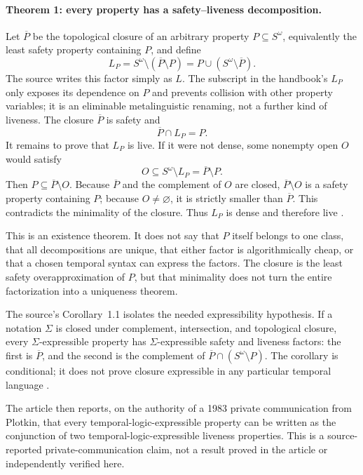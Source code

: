 \paragraph{Theorem 1: every property has a safety--liveness decomposition.}
Let \(\overline P\) be the topological closure of an arbitrary property
\(P\subseteq S^\omega\), equivalently the least safety property containing
\(P\), and define
\[
 L_P
 =S^\omega\setminus(\overline P\setminus P)
 =P\cup(S^\omega\setminus\overline P).
\]
The source writes this factor simply as \(L\).  The subscript in the
handbook's \(L_P\) only exposes its dependence on \(P\) and prevents collision
with other property variables; it is an eliminable metalinguistic renaming,
not a further kind of liveness.  The closure \(\overline P\) is
safety and
\[
 \overline P\cap L_P=P.
\]
It remains to prove that \(L_P\) is live.  If it were not dense, some nonempty
open \(O\) would satisfy
\[
 O\subseteq S^\omega\setminus L_P=\overline P\setminus P.
\]
Then \(P\subseteq\overline P\setminus O\).  Because \(\overline P\) and the
complement of \(O\) are closed, \(\overline P\setminus O\) is a safety
property containing \(P\); because \(O\neq\varnothing\), it is strictly
smaller than \(\overline P\).  This contradicts the minimality of the closure.
Thus \(L_P\) is dense and therefore live
\cite[Theorem~1, p.~184]{AlpernSchneider1985}.

This is an existence theorem.  It does not say that \(P\) itself belongs to
one class, that all decompositions are unique, that either factor is
algorithmically cheap, or that a chosen temporal syntax can express the
factors.  The closure is the least safety overapproximation of \(P\), but that
minimality does not turn the entire factorization into a uniqueness theorem.

The source's Corollary~1.1 isolates the needed expressibility hypothesis.  If
a notation \(\Sigma\) is closed under complement, intersection, and
topological closure, every \(\Sigma\)-expressible property has
\(\Sigma\)-expressible safety and liveness factors: the first is
\(\overline P\), and the second is the complement of
\(\overline P\cap(S^\omega\setminus P)\).  The corollary is conditional; it
does not prove closure expressible in any particular temporal language
\cite[Corollary~1.1, p.~184]{AlpernSchneider1985}.

The article then reports, on the authority of a 1983 private communication
from Plotkin, that every temporal-logic-expressible property can be written as
the conjunction of two temporal-logic-expressible liveness properties.  This
is a source-reported private-communication claim, not a result proved in the
article or independently verified here.

